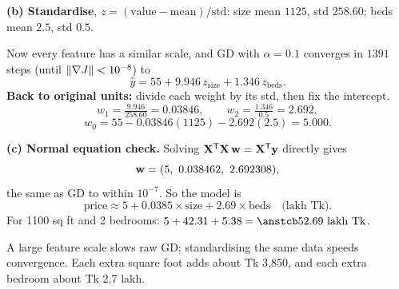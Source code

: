 \begin{frame}{}
  \textbf{(b) Standardise}, $z = (\text{value} - \text{mean})/\text{std}$:
  size mean $1125$, std $258.60$; beds mean $2.5$, std $0.5$.

  \vspace{3pt}
  Now every feature has a similar scale, and GD with $\alpha = 0.1$ converges in $1391$ steps
  (until $\left\lVert \nabla J \right\rVert < 10^{-8}$) to
  \[
    \hat y = 55 + 9.946\,z_{\text{size}} + 1.346\,z_{\text{beds}} .
  \]
  \textbf{Back to original units:} divide each weight by its std, then fix the intercept.
  \[
    w_1 = \tfrac{9.946}{258.60} = 0.03846,\qquad w_2 = \tfrac{1.346}{0.5} = 2.692,
  \]
  \[
    w_0 = 55 - 0.03846(1125) - 2.692(2.5) = 5.000 .
  \]
\end{frame}

\begin{frame}{}
  \textbf{(c) Normal equation check.} Solving $\mathbf{X}^{\mathsf T}\mathbf{X}\,\mathbf{w} = \mathbf{X}^{\mathsf T}\mathbf{y}$ directly gives
  \[
    \mathbf{w} = (5,\ 0.038462,\ 2.692308),
  \]
  the same as GD to within $10^{-7}$. So the model is
  \[
    \text{price} \approx 5 + 0.0385\times\text{size} + 2.69\times\text{beds}\quad\text{(lakh Tk)}.
  \]
  For 1100 sq ft and 2 bedrooms: $5 + 42.31 + 5.38 = \ans{52.69\text{ lakh Tk}}$.
  \begin{keybox}
    A large feature scale slows raw GD; standardising the same data speeds convergence.
    Each extra square foot adds about Tk 3,850, and each extra bedroom about Tk 2.7 lakh.
  \end{keybox}
\end{frame}
